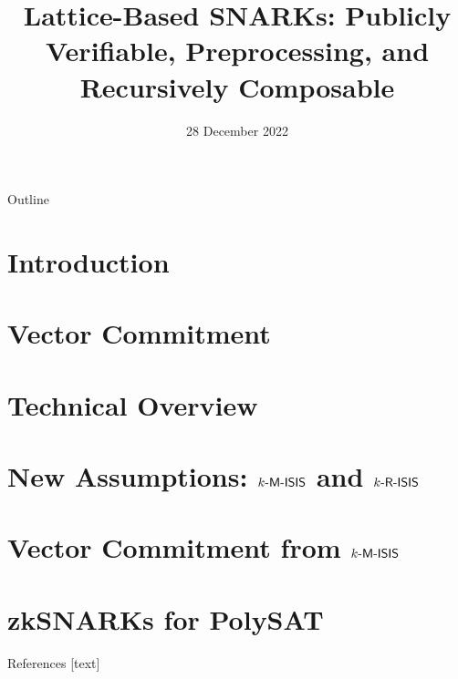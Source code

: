 \documentclass{beamer}
\title{Lattice-Based SNARKs: Publicly Verifiable, Preprocessing, and Recursively Composable}
\date{28 December 2022}
\begin{document}
	\begin{frame}
		\titlepage
	\end{frame}
	
	\begin{frame}{Outline}
		\tableofcontents
	\end{frame}
	
	\section{Introduction}
	
	
	\section{Vector Commitment}
	
	
	\section{Technical Overview}
	
	
	\section{New Assumptions: $k\textsf{-M-ISIS}$ and $k\textsf{-R-ISIS}$}
	
	
	\section{Vector Commitment from $k\textsf{-M-ISIS}$}
	
	
	\section{zkSNARKs for PolySAT}
	
	
	\thankyouframe
	
	\begin{frame}[allowframebreaks]{References}
		
		
		
	\end{frame}
	
\end{document}
